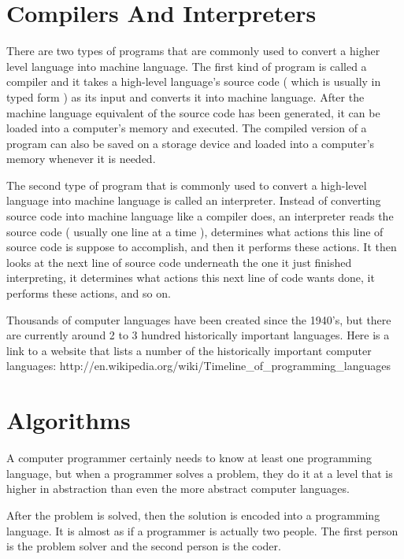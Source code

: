 \documentclass[12pt,oneside]{book}
\begin{document}
\section[Compilers And Interpreters]{Compilers And Interpreters}

There are two types of programs that are commonly used to convert a higher level language into machine language. The first kind of program is called a compiler and it takes a high{}-level language's source code ( which is usually in typed form ) as its input and converts it into machine language. After the machine language equivalent of the source code has been generated, it can be loaded into a computer's memory and executed. The compiled version of a program can also be saved on a storage device and loaded into a computer's memory whenever it is needed.


The second type of program that is commonly used to convert a high{}-level language into machine language is called an interpreter. Instead of converting source code into machine language like a compiler does, an interpreter reads the source code ( usually one line at a time ), determines what actions this line of source code is suppose to accomplish, and then it performs these actions. It then looks at the next line of source code underneath the one it just finished interpreting, it determines what actions this next line of code wants done, it performs these actions, and so on. 

Thousands of computer languages have been created since the 1940's, but there are currently around 2 to 3 hundred historically important languages. Here is a link to a website that lists a number of the historically important computer languages:
http://en.wikipedia.org/wiki/Timeline\_of\_programming\_languages 

\section[Algorithms]{Algorithms}

A computer programmer certainly needs to know at least one programming language, but when a programmer solves a problem, they do it at a level that is higher in abstraction than even the more abstract computer languages.


After the problem is solved, then the solution is encoded into a programming language. It is almost as if a programmer is actually two people. The first person is the problem solver and the second person is the coder. 
\end{document}
